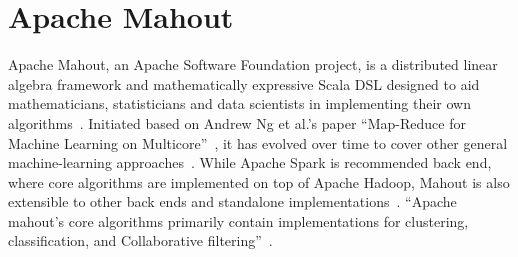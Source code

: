 \section{Apache Mahout}

Apache Mahout, an Apache Software Foundation project, is a distributed linear algebra framework and mathematically expressive Scala DSL designed to aid mathematicians, statisticians and data scientists in implementing their own algorithms~\cite{hid-sp18-510-web-Mahout}. Initiated based on Andrew Ng et al.'s paper ``Map-Reduce for Machine Learning on Multicore''~\cite{hid-sp18-510-ng-Mahout}, it has evolved over time to cover other general machine-learning approaches~\cite{hid-sp18-510-ibm-Mahout}. While Apache Spark is recommended back end, where core algorithms are implemented on top of Apache Hadoop, Mahout is also extensible to other back ends and standalone implementations~\cite{hid-sp18-510-wiki-Mahout}. ``Apache mahout’s core algorithms primarily contain implementations for clustering, classification, and Collaborative filtering''~\cite{hid-sp18-510-wiki-Mahout}.
